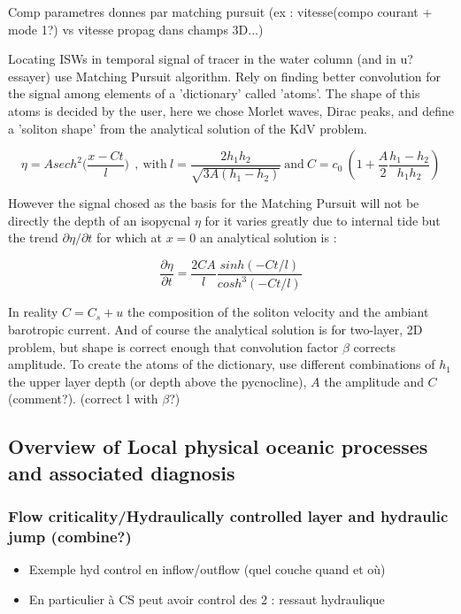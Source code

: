 Comp parametres donnes par matching pursuit (ex : vitesse(compo courant + mode 1?) vs vitesse propag dans champs 3D...)

Locating ISWs in temporal signal of tracer in the water column (and in u? essayer) use Matching Pursuit algorithm. Rely on finding better convolution for the signal among elements of a 'dictionary' called 'atoms'. The shape of this atoms is decided by the user, here we chose Morlet waves, Dirac peaks, and define a 'soliton shape' from the analytical solution of the KdV problem.

\begin{equation}
\eta = A sech^2\bigg( \frac{x-Ct}{l} \bigg) \ \ , \ \text{with} \ l = \frac{2h_1h_2}{\sqrt{3A(h_1-h_2)}} \ \text{and} \ C=c_0 \ (1 + \frac{A}{2} \frac{h_1-h_2}{h_1h_2})
\end{equation}

However the signal chosed as the basis for the Matching Pursuit will not be directly the depth of an isopycnal $\eta$ for it varies greatly due to internal tide but the trend $\partial \eta/\partial t$ for which at $x=0$ an analytical solution is :

\begin{equation}
\frac{\partial \eta}{\partial t} = \frac{2 C A}{l} \frac{sinh(-Ct/l)}{cosh^3(-Ct/l)}
\end{equation}

In reality $C=C_s+u$ the composition of the soliton velocity and the ambiant barotropic current. And of course the analytical solution is for two-layer, 2D problem, but shape is correct enough that convolution factor $\beta$ corrects amplitude. To create the atoms of the dictionary, use different combinations of $h_1$ the upper layer depth (or depth above the pycnocline), $A$ the amplitude and $C$  (comment?). (correct l with $\beta$?)


\subsection{Overview of Local physical oceanic processes and associated diagnosis}


\subsubsection{Flow criticality/Hydraulically controlled layer and hydraulic jump (combine?)}

\begin{itemize}
\item Exemple hyd control en inflow/outflow (quel couche quand et où)
\item En particulier à CS peut avoir control des 2 : ressaut hydraulique
\end{itemize}



